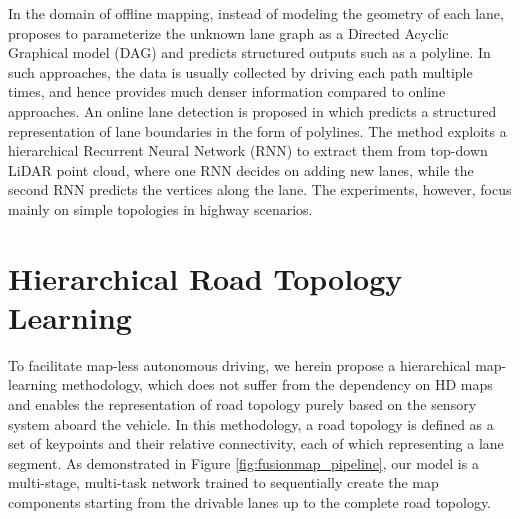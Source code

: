 \documentclass[10pt,twocolumn,letterpaper]{article}
\begin{document}
In the domain of offline mapping, instead of modeling the geometry of each lane, \cite{homayounfar2019dagmapper} proposes to parameterize the unknown lane graph as a Directed Acyclic Graphical model (DAG) and predicts structured outputs such as a polyline. In such approaches, the data is usually collected by driving each path multiple times, and hence provides much denser information compared to online approaches. An online lane detection is proposed in \cite{homayounfar2018hierarchical} which predicts a structured representation of lane boundaries in the form of polylines. The method exploits a hierarchical Recurrent Neural Network (RNN) to extract them from top-down LiDAR point cloud, where one RNN decides on adding new lanes, while the second RNN predicts the vertices along the lane. The experiments, however, focus mainly on simple topologies in highway scenarios.

\section{Hierarchical Road Topology Learning}
To facilitate map-less autonomous driving, we herein propose a hierarchical map-learning methodology, which does not suffer from the dependency on HD maps and enables the representation of road topology purely based on the sensory system aboard the vehicle. In this methodology, a road topology is defined as a set of keypoints and their relative connectivity, each of which representing a lane segment. As demonstrated in Figure \ref{fig:fusionmap_pipeline}, our model is a multi-stage, multi-task network trained to sequentially create the map components starting from the drivable lanes up to the complete road topology.
\end{document}
